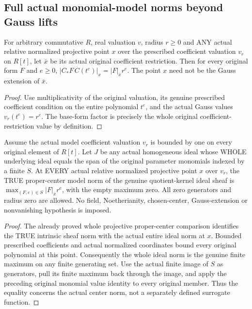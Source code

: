 \subsection{Full actual monomial-model norms beyond Gauss lifts}

\begin{lemma}
\label{local:actual-relative-parameter-monomial-value}
\leanok
{}
For arbitrary commutative $R$, real valuation $v$, radius $r\ge0$ and
ANY actual relative normalized projective point $x$ over the prescribed
coefficient valuation $v_r$ on $R[t]$, let $\bar x$ be its actual original
coefficient restriction. Then for every original form $F$ and $e\ge0$,
$|C_*F\,C(t^e)|_x=|F|_{\bar x}r^e$. The point $x$ need not be the Gauss
extension of $\bar x$.
\end{lemma}
\begin{proof}
Use multiplicativity of the original valuation, its genuine prescribed
coefficient condition on the entire polynomial $t^e$, and the actual
Gauss values $v_r(t^e)=r^e$. The base-form factor is precisely the whole
original coefficient-restriction value by definition.
\end{proof}

\begin{theorem}
\label{local:actual-all-relative-monomial-model-norm}
\leanok
{}
Assume the actual model coefficient valuation $v_r$ is bounded by one
on every original element of $R[t]$. Let $J$ be any actual homogeneous
ideal whose WHOLE underlying ideal equals the span of the original
parameter monomials indexed by a finite $S$. At EVERY actual relative
normalized projective point $x$ over $v_r$, the TRUE proper-center model
norm of the genuine quotient-kernel ideal sheaf is
$\max_{(F,e)\in S}|F|_{\bar x}r^e$, with the empty maximum zero.
All zero generators and radius zero are allowed. No field,
Noetherianity, chosen-center, Gauss-extension or nonvanishing hypothesis
is imposed.
\end{theorem}
\begin{proof}
The already proved whole projective proper-center comparison identifies
the TRUE intrinsic sheaf norm with the actual entire ideal norm at $x$.
Bounded prescribed coefficients and actual normalized coordinates bound
every original polynomial at this point. Consequently the whole ideal
norm is the genuine finite maximum on any finite generating set.
Use the actual finite image of $S$ as generators, pull its finite maximum
back through the image, and apply the preceding original monomial value
identity to every original member. Thus the equality concerns the actual
center norm, not a separately defined surrogate function.
\end{proof}

